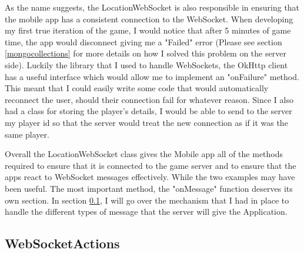 \documentclass{l4proj}
\begin{document}
As the name suggests, the LocationWebSocket is also responsible in ensuring that the mobile app has a consistent connection to the
WebSocket. When developing my first true iteration of the game, I would notice that after 5 minutes of game time, 
the app would disconnect giving me a "Failed" error (Please see section \ref{mongocollections} for more details on how I solved this problem on the server side). 
Luckily the library that I used to handle WebSockets, the OkHttp client \citep{okhttp} has a useful
interface which would allow me to implement an "onFailure" method. This meant that I could easily write some code that would automatically
reconnect the user, should their connection fail for whatever reason. Since I also had a class for storing the player's
details, I would be able to send to the server my player id so that the server would treat the new connection as if it was
the same player.

Overall the LocationWebSocket class gives the Mobile app all of the methods required to ensure that it is connected to the game
server and to ensure that the apps react to WebSocket messages effectively. While the two examples may have been useful. The most
important method, the "onMessage" function deserves its own section. In section \ref{websocketactions}, I will go over the mechanism
that I had in place to handle the different types of message that the server will give the Application.

\subsection{WebSocketActions}
\label{websocketactions}
\end{document}
